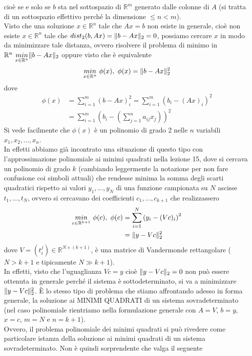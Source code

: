 \documentclass[12pt,a4paper]{article}
\DeclarePairedDelimiter{\norma}{\lVert}{\rVert}
\begin{document}
cioè se e solo se $b$ sta nel sottospazio di $\mathbb{R}^m$ generato dalle colonne di $A$ (si tratta di un sottospazio effettivo perché la dimensione $\leq n < m$). \\
Visto che una soluzione $x \in \mathbb{R}^n$ tale che $Ax=b$ non esiste in generale, cioè non esiste $x \in \mathbb{R}^n$ tale che $dist_2(b,Ax)=\norma{b-Ax}_2 = 0$, possiamo cercare $x$ in modo da minimizzare tale distanza, ovvero risolvere il problema di minimo in $\mathbb{R}^n \ \underset{x\in \mathbb{R}^n}{min} \norma{b-Ax}_2 $ oppure visto che è equivalente
\begin{equation*}
    \underset{x\in \mathbb{R}^n}{min} \ \phi(x), \ \phi(x)=\norma{b-Ax}_2^2
\end{equation*}
dove
\begin{equation*}
    \begin{split}
        \phi(x) & = \sum_{i=1}^m \left(b-Ax\right)_i^2 = \sum_{i=1}^m \left(b_i - (Ax)_i\right)^2 \\
        & = \sum_{i=1}^m \left(b_i - \left( \sum_{j=1}^n a_{ij}x_j \right) \right)^2
    \end{split}
\end{equation*}
Si vede facilmente che $\phi(x)$ è un polinomio di grado 2 nelle $n$ variabili $x_1, x_2, \dots, x_n$. \\
In effetti abbiamo già incontrato una situazione di questo tipo con l'approssimazione polinomiale ai minimi quadrati nella lezione 15, dove si cercava un polinomio di grado $k$ (cambiando leggermente la notazione per non fare confusione coi simboli attuali) che rendesse minima la somma degli scarti quadratici rispetto ai valori $y_1,\dots,y_N$ di una funzione campionata su $N$ ascisse $t_1,\dots,t_N$, ovvero si cercavano dei coefficienti $c_1,\dots,c_{k+1}$ che realizzassero
\begin{equation*}
    \begin{split}
        \underset{c\in \mathbb{R}^{k+1}}{min} \ \phi(c), \ \phi(c) & = \sum_ {i=1}^N \left( y_i - (Vc)_i \right)^2 \\
        & = \norma{y-Vc}_2^2
    \end{split}
\end{equation*}
dove $V=(t_i^j) \in \mathbb{R}^{N\times (k+1)}$, è una matrice di Vandermonde rettangolare ($N>k+1$ e tipicamente $N\gg k+1$). \\
In effetti, visto che l'uguaglianza $Vc=y$ cioè $\norma{y-Vc}_2=0$ non può essere ottenuta in generale perché il sistema è sottodeterminato, si va a minimizzare $\norma{y-Vc}_2^2$. È lo stesso tipo di problema che stiamo affrontando adesso in forma generale, la soluzione ai MINIMI QUADRATI di un sistema sovradeterminato (nel caso polinomiale rientriamo nella formulazione generale con $A=V$, $b=y$, $x=c$, $m=N$ e $n=k+1$).\\
Ovvero, il problema polinomiale dei minimi quadrati si può rivedere come particolare istanza della soluzione ai minimi quadrati di un sistema sovradeterminato. Non è quindi sorprendente che valga il seguente
\end{document}
